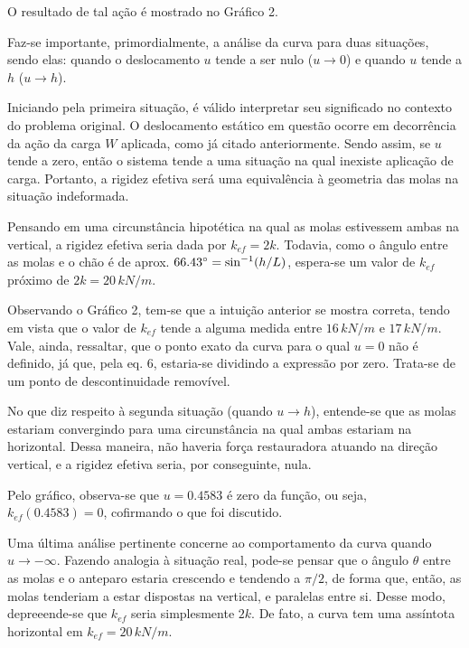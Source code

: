 \documentclass[a4paper, 12pt]{article}
\begin{document}
	O resultado de tal ação é mostrado no Gráfico 2.
	
	Faz-se importante, primordialmente, a análise da curva para duas situações, sendo elas: quando o deslocamento $u$ tende
	a ser nulo ($u\rightarrow 0$) e quando $u$ tende a $h$ ($u\rightarrow h$).
	
	Iniciando pela primeira situação, é válido interpretar seu significado no contexto do problema original. O deslocamento
	estático em questão ocorre em decorrência da ação da carga $W$ aplicada, como já citado anteriormente.  Sendo assim, se
	$u$ tende a zero, então o sistema tende a uma situação na qual inexiste aplicação de carga. Portanto, a rigidez efetiva
	será uma equivalência à geometria das molas na situação indeformada. 
	
	Pensando em uma circunstância hipotética na qual
	as molas estivessem ambas na vertical, a rigidez efetiva seria dada por $k_{ef}=2k$. Todavia, como o ângulo entre as 
	molas e o chão é de aprox. $66.43\degree =\sin ^{-1}(h/L)$, espera-se um valor de $k_{ef}$ próximo de $2k=20\,kN/m$.
	
	Observando o Gráfico 2, tem-se que a intuição anterior se mostra correta, tendo em vista que o valor de $k_{ef}$ tende
	a alguma medida entre $16\,kN/m$ e $17\,kN/m$. Vale, ainda, ressaltar, que o ponto exato da curva para o qual $u=0$ não
	é definido, já que, pela eq. 6, estaria-se dividindo a expressão por zero. Trata-se de um ponto de descontinuidade 
	removível.
	
	No que diz respeito à segunda situação (quando $u\rightarrow h$), entende-se que as molas estariam convergindo para uma
	circunstância na qual ambas estariam na horizontal. Dessa maneira, não haveria força restauradora atuando na direção
	vertical, e a rigidez efetiva seria, por conseguinte, nula.
	
	\newpage
	
	Pelo gráfico, observa-se que $u=0.4583$ é zero da função, ou seja, $k_{ef}(0.4583)=0$, cofirmando o que foi discutido.
	
	Uma última análise pertinente concerne ao comportamento da curva quando $u\rightarrow -\infty$. Fazendo analogia à 
	situação real, pode-se pensar que o ângulo $\theta$ entre as molas e o anteparo estaria crescendo e tendendo a $\pi /2$,
	de forma que, então, as molas tenderiam a estar dispostas na vertical, e paralelas entre si. Desse modo, depreeende-se 
	que $k_{ef}$ seria simplesmente $2k$. De fato, a curva tem uma assíntota horizontal em $k_{ef}=20\,kN/m$.
	
\end{document}
